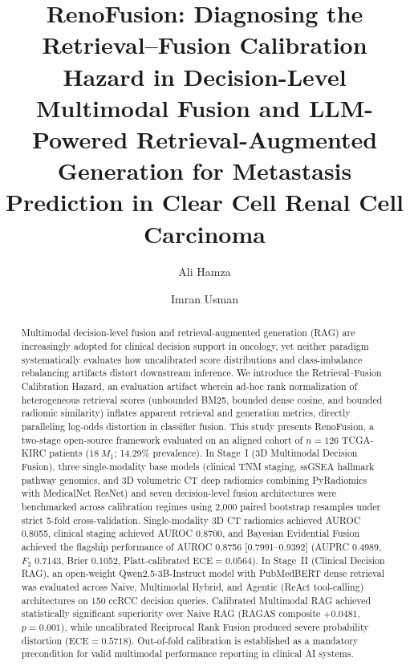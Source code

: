 \documentclass[a4paper,fleqn]{cas-dc}
\begin{document}
\let\WriteBookmarks\relax
\def\floatpagepagefraction{0.75}
\def\textpagefraction{.05}


\title [mode = title]{RenoFusion: Diagnosing the Retrieval--Fusion Calibration Hazard in Decision-Level Multimodal Fusion and LLM-Powered Retrieval-Augmented Generation for Metastasis Prediction in Clear Cell Renal Cell Carcinoma}


\author[1]{Ali Hamza}
\cormark[1]

\author[1]{Imran Usman}

\address[1]{National University of Sciences and Technology (NUST), Islamabad, Pakistan}


\begin{abstract}
Multimodal decision-level fusion and retrieval-augmented generation (RAG) are increasingly adopted for clinical decision support in oncology, yet neither paradigm systematically evaluates how uncalibrated score distributions and class-imbalance rebalancing artifacts distort downstream inference. We introduce the Retrieval--Fusion Calibration Hazard, an evaluation artifact wherein ad-hoc rank normalization of heterogeneous retrieval scores (unbounded BM25, bounded dense cosine, and bounded radiomic similarity) inflates apparent retrieval and generation metrics, directly paralleling log-odds distortion in classifier fusion. This study presents RenoFusion, a two-stage open-source framework evaluated on an aligned cohort of $n = 126$ TCGA-KIRC patients ($18~M_1$; 14.29\% prevalence). In Stage~I (3D Multimodal Decision Fusion), three single-modality base models (clinical TNM staging, ssGSEA hallmark pathway genomics, and 3D volumetric CT deep radiomics combining PyRadiomics with MedicalNet ResNet) and seven decision-level fusion architectures were benchmarked across calibration regimes using 2,000 paired bootstrap resamples under strict 5-fold cross-validation. Single-modality 3D CT radiomics achieved AUROC 0.8055, clinical staging achieved AUROC 0.8700, and Bayesian Evidential Fusion achieved the flagship performance of AUROC 0.8756 [0.7991--0.9392] (AUPRC 0.4989, $F_2$ 0.7143, Brier 0.1052, Platt-calibrated $\text{ECE} = 0.0564$). In Stage~II (Clinical Decision RAG), an open-weight Qwen2.5-3B-Instruct model with PubMedBERT dense retrieval was evaluated across Naive, Multimodal Hybrid, and Agentic (ReAct tool-calling) architectures on 150 ccRCC decision queries. Calibrated Multimodal RAG achieved statistically significant superiority over Naive RAG (RAGAS composite $+0.0481$, $p = 0.001$), while uncalibrated Reciprocal Rank Fusion produced severe probability distortion ($\text{ECE} = 0.5718$). Out-of-fold calibration is established as a mandatory precondition for valid multimodal performance reporting in clinical AI systems.
\end{abstract}
\end{document}
